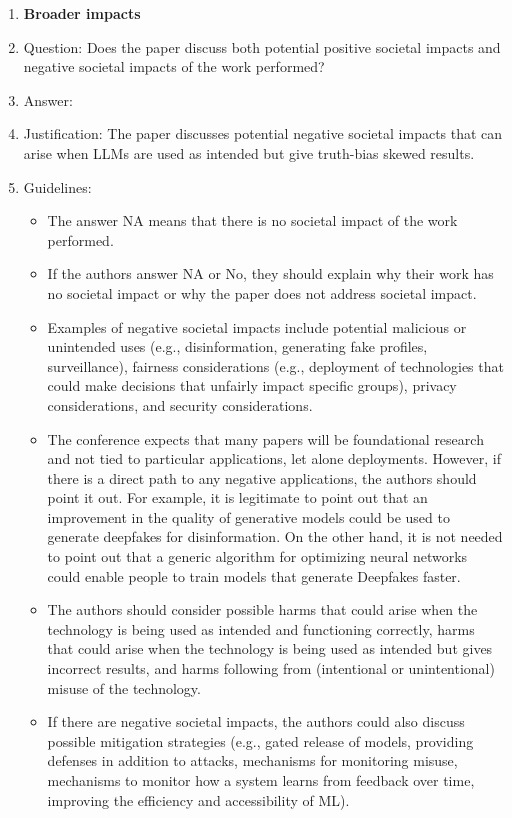 \documentclass{article}
\begin{document}
\begin{enumerate}
\item {\bf Broader impacts}
    \item[] Question: Does the paper discuss both potential positive societal impacts and negative societal impacts of the work performed?
    \item[] Answer: \answerYes{} %
    \item[] Justification: The paper discusses potential negative societal impacts that can arise when LLMs are used as intended but give truth-bias skewed results.
    \item[] Guidelines:
    \begin{itemize}
        \item The answer NA means that there is no societal impact of the work performed.
        \item If the authors answer NA or No, they should explain why their work has no societal impact or why the paper does not address societal impact.
        \item Examples of negative societal impacts include potential malicious or unintended uses (e.g., disinformation, generating fake profiles, surveillance), fairness considerations (e.g., deployment of technologies that could make decisions that unfairly impact specific groups), privacy considerations, and security considerations.
        \item The conference expects that many papers will be foundational research and not tied to particular applications, let alone deployments. However, if there is a direct path to any negative applications, the authors should point it out. For example, it is legitimate to point out that an improvement in the quality of generative models could be used to generate deepfakes for disinformation. On the other hand, it is not needed to point out that a generic algorithm for optimizing neural networks could enable people to train models that generate Deepfakes faster.
        \item The authors should consider possible harms that could arise when the technology is being used as intended and functioning correctly, harms that could arise when the technology is being used as intended but gives incorrect results, and harms following from (intentional or unintentional) misuse of the technology.
        \item If there are negative societal impacts, the authors could also discuss possible mitigation strategies (e.g., gated release of models, providing defenses in addition to attacks, mechanisms for monitoring misuse, mechanisms to monitor how a system learns from feedback over time, improving the efficiency and accessibility of ML).
    \end{itemize}
    

\end{enumerate}
\end{document}
